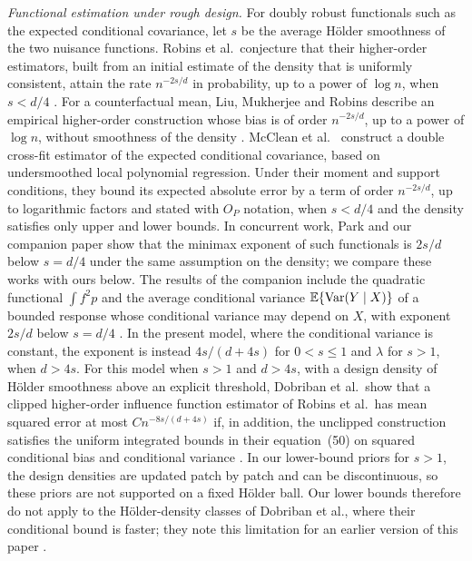 \emph{Functional estimation under rough design.} For doubly robust
functionals such as the expected conditional covariance, let $s$ be the
average H\"older smoothness of the two nuisance functions. Robins et al.\
conjecture that their higher-order estimators, built from an initial
estimate of the density that is uniformly consistent, attain the rate $n^{-2s/d}$
in probability, up to a power of $\log n$, when $s<d/4$
\cite[p.~381]{RobinsEtAl2008}. For a counterfactual mean, Liu,
Mukherjee and Robins describe an empirical higher-order construction
whose bias is of order $n^{-2s/d}$, up to a power of $\log n$, without
smoothness of the density \cite[Section~4]{LiuMukherjeeRobins2020}.
McClean et al.\ \cite[Section~4.2, Theorem~1]{McCleanEtAl2024} construct
a double cross-fit estimator of the expected conditional covariance,
based on undersmoothed local polynomial regression. Under their moment
and support conditions, they bound its expected absolute error by a
term of order $n^{-2s/d}$, up to logarithmic factors and stated with
$O_P$ notation, when $s<d/4$ and the density satisfies only upper and
lower bounds. In concurrent work, Park \cite{Park2026} and
our companion paper \cite{AronowKallusLopatto2026} show that the
minimax exponent of such functionals is $2s/d$ below $s=d/4$ under the
same assumption on the density; we compare these works with ours
below. The results of the companion include the
quadratic functional $\int f^2p$ and the average conditional variance
$\mathbb E\{\operatorname{Var}(Y\mid X)\}$ of a bounded response whose conditional variance
may depend on $X$, with exponent $2s/d$ below $s=d/4$
\cite[Section~3.2]{AronowKallusLopatto2026}. In the present model,
where the conditional variance is constant, the exponent is instead
$4s/(d+4s)$ for $0<s\le1$ and $\lambda$ for $s>1$, when $d>4s$. For
this model when $s>1$ and $d>4s$, with a design density of H\"older
smoothness above an explicit threshold, Dobriban et al.\ show that a
clipped higher-order influence function estimator of Robins et al.\ has
mean squared error at most $Cn^{-8s/(d+4s)}$ if, in addition, the
unclipped construction satisfies the uniform integrated bounds in their
equation~(50) on squared conditional bias and conditional variance
\cite[Theorem~2.1]{DobribanEtAl2026}. In our lower-bound priors for
$s>1$, the design densities are updated patch by patch and can be
discontinuous, so these priors are not supported on a fixed H\"older
ball. Our lower bounds therefore do not apply to the H\"older-density
classes of Dobriban et al., where their conditional bound is faster;
they note this limitation for an earlier version of this paper
\cite[Section~4]{DobribanEtAl2026}.

